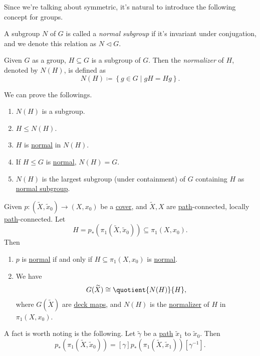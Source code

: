 Since we're talking about symmetric, it's natural to introduce the following concept for groups.
\begin{definition}\label{def:normal-subgroup}
	A subgroup \(N\) of \(G\) is called a \emph{normal subgroup} if it's invariant under conjugation, and we denote this relation as \(N \triangleleft G\).
\end{definition}

\begin{definition}[Normalizer]\label{def:normalizer}
	Given \(G\) as a group, \(H\subseteq G\) is a subgroup of \(G\). Then the \emph{normalizer} of \(H\), denoted by \(N(H)\), is defined as
	\[
		N(H) \coloneqq \left\{g\in G \mid gH = H g\right\}.
	\]
\end{definition}

\begin{exercise}
	We can prove the followings.
	\begin{enumerate}[(1)]
		\item \(N(H)\) is a subgroup.
		\item \(H\leq N(H)\).
		\item \(H\) is \hyperref[def:normal-subgroup]{normal} in \(N(H)\).
		\item If \(H\leq G\) is \hyperref[def:normal-subgroup]{normal}, \(N(H) = G\).
		\item \(N(H)\) is the largest subgroup (under containment) of \(G\) containing \(H\) as \hyperref[def:normal-subgroup]{normal subgroup}.
	\end{enumerate}
\end{exercise}

\begin{proposition}\label{prop:lec17}
	Given \(p\colon (\widetilde{X} , \widetilde{x} _0)\to (X, x_0)\) be a \hyperref[def:covering-map]{cover}, and \(\widetilde{X} , X\)
	are \hyperref[def:path]{path}-connected, locally \hyperref[def:path]{path}-connected. Let
	\[
		H = p_\ast (\pi _1(\widetilde{X} , \widetilde{x} _0))\subseteq \pi _1(X, x_0).
	\]
	Then
	\begin{enumerate}[(1)]
		\item \(p\) is \hyperref[def:normal-cover]{normal} if and only if \(H\subseteq \pi _1(X, x_0)\) is \hyperref[def:normal-subgroup]{normal}.
		\item We have
		      \[
			      G(\widetilde{X} )\cong \quotient{N(H)}{H},
		      \]
		      where \(G(\widetilde{X} )\) are \hyperref[def:deck-transformation]{deck maps}, and \(N(H)\) is the \hyperref[def:normalizer]{normalizer}
		      of \(H\) in \(\pi _1(X, x_0)\).
	\end{enumerate}
\end{proposition}

\begin{remark}
	A fact is worth noting is the following. Let \(\widetilde{\gamma} \) be a \hyperref[def:path]{path} \(\widetilde{x} _1\) to \(\widetilde{x} _0\).
	Then
	\[
		p_\ast (\pi _1(\widetilde{X} , \widetilde{x} _0))= [\gamma ] p_\ast (\pi _1(\widetilde{X} , \widetilde{x} _1)) [\gamma ^{-1}].
	\]
	\begin{figure}[H]
		\centering
		\label{fig:rmk:lec17:1}
	\end{figure}
\end{remark}